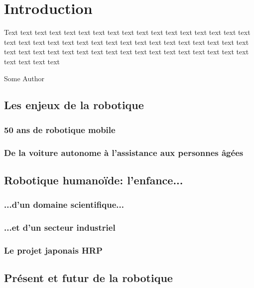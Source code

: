 \chapter{Introduction}
\label{chap:intro}

\epigraph{Text text text text text text text text text text text text
  text text text text text text text text text text text text text
  text text text text text text text text text text text text text
  text text text text text text text text text text text text text
  text text text text}{Some Author}
\clearpage


\section{Les enjeux de la robotique}

\subsection{50 ans de robotique mobile}
\subsection{De la voiture autonome à l'assistance aux personnes âgées}

\section{Robotique humanoïde: l'enfance...}

\subsection{...d'un domaine scientifique...}
\subsection{...et d'un secteur industriel}

\subsection{Le projet japonais HRP}

\section{Présent et futur de la robotique}

